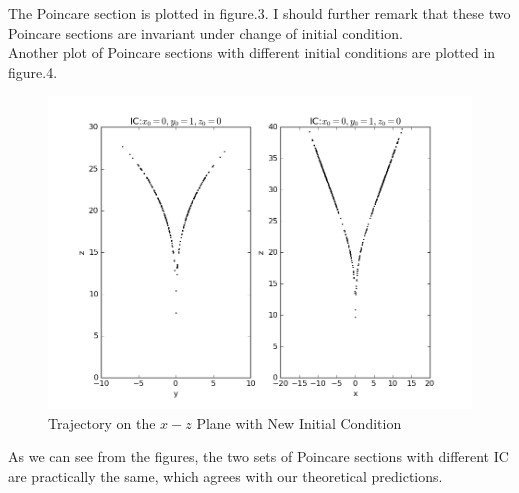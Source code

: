 \documentclass[10pt,a4paper]{article}
\begin{document}
    The Poincare section is plotted in figure.3. I should further remark that these two Poincare sections are invariant under change of initial condition.\\
    Another plot of Poincare sections with different initial conditions are plotted in figure.4.
    \begin{figure}[htbp]
    	\centering
    	\includegraphics[width=5in]{Lorenz_6.png}
    	\caption{Trajectory on the $x-z$ Plane with New Initial Condition}
    \end{figure}
    As we can see from the figures, the two sets of Poincare sections with different IC are practically the same, which agrees with our theoretical predictions.
    
\end{document}
